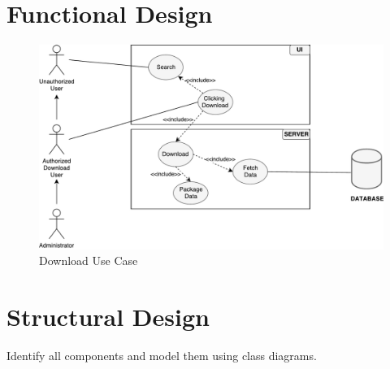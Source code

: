 \documentclass{article}
\begin{document}
\clearpage

\section{Functional Design}

\begin{figure}[h!]
	\begin{center}
		\caption{Download Use Case}
		\includegraphics[width=\textwidth]{images/download_use_case.pdf}
	\end{center}
\end{figure}

\clearpage

\section{Structural Design}

Identify all components and model them using class diagrams.
\end{document}
